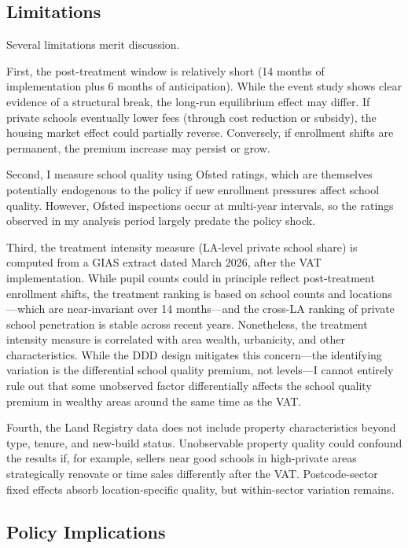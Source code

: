 \documentclass[12pt]{article}
\begin{document}
\subsection{Limitations}

Several limitations merit discussion.

First, the post-treatment window is relatively short (14 months of implementation plus 6 months of anticipation). While the event study shows clear evidence of a structural break, the long-run equilibrium effect may differ. If private schools eventually lower fees (through cost reduction or subsidy), the housing market effect could partially reverse. Conversely, if enrollment shifts are permanent, the premium increase may persist or grow.

Second, I measure school quality using Ofsted ratings, which are themselves potentially endogenous to the policy if new enrollment pressures affect school quality. However, Ofsted inspections occur at multi-year intervals, so the ratings observed in my analysis period largely predate the policy shock.

Third, the treatment intensity measure (LA-level private school share) is computed from a GIAS extract dated March 2026, after the VAT implementation. While pupil counts could in principle reflect post-treatment enrollment shifts, the treatment ranking is based on school counts and locations---which are near-invariant over 14 months---and the cross-LA ranking of private school penetration is stable across recent years. Nonetheless, the treatment intensity measure is correlated with area wealth, urbanicity, and other characteristics. While the DDD design mitigates this concern---the identifying variation is the differential school quality premium, not levels---I cannot entirely rule out that some unobserved factor differentially affects the school quality premium in wealthy areas around the same time as the VAT.

Fourth, the Land Registry data does not include property characteristics beyond type, tenure, and new-build status. Unobservable property quality could confound the results if, for example, sellers near good schools in high-private areas strategically renovate or time sales differently after the VAT. Postcode-sector fixed effects absorb location-specific quality, but within-sector variation remains.

\subsection{Policy Implications}
\end{document}
